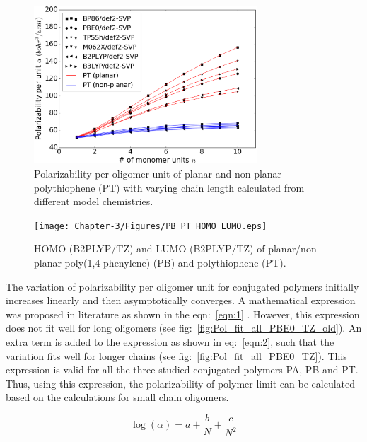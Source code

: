 \begin{figure}[htbp] 
	\centering
	\includegraphics[width=0.744\textwidth]{Chapter-3/Figures/C_NC_PT.eps}
	\caption{Polarizability per oligomer unit of planar and non-planar polythiophene (PT) with varying chain length calculated from different model chemistries.} 
	\label{fig:C_NC_PT} 
\end{figure}  

\begin{figure}[htbp] 
	\centering
	\texttt{[image: Chapter-3/Figures/PB\_PT\_HOMO\_LUMO.eps]}
	\caption{HOMO (B2PLYP/TZ) and LUMO (B2PLYP/TZ) of planar/non-planar poly(1,4-phenylene) (PB) and polythiophene (PT).} 
	\label{fig:PB_PT_HOMO_LUMO} 
\end{figure}  

The variation of polarizability per oligomer unit for conjugated polymers initially increases linearly and then asymptotically converges. A mathematical expression was proposed in literature as shown in the eqn:\ \ref{eqn:1} \cite{Hurst1988}. However, this expression does not fit well for long oligomers (see fig:\ \ref{fig:Pol_fit_all_PBE0_TZ_old}). An extra term is added to the expression as shown in eq:\ \ref{eqn:2}, such that the variation fits well for longer chains (see fig:\ \ref{fig:Pol_fit_all_PBE0_TZ}). This expression is valid for all the three studied conjugated polymers PA, PB and PT. Thus, using this expression, the polarizability of polymer limit can be calculated based on the calculations for small chain oligomers. 

\begin{equation} \label{eqn:1}
\log(\alpha)=a+\frac{b}{N}+\frac{c}{N^2}
\end{equation}


